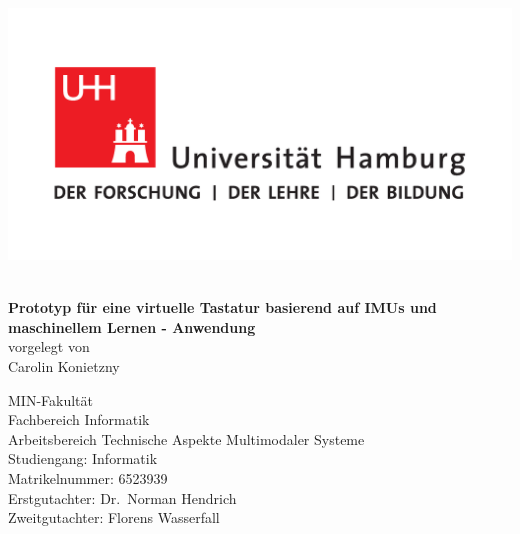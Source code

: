 \frontmatter
{}
\begin{titlepage}
\includegraphics[scale=0.3]{UHH-Logo_2010_Farbe_CMYK.pdf}
\vspace*{2cm}
\Large
\begin{center}{\color{uhhred}\textbf{}}
\vspace*{2.0cm}\\
{\LARGE \textbf{Prototyp für eine virtuelle Tastatur basierend auf IMUs und maschinellem Lernen - Anwendung}}
\vspace*{2.0cm}\\
vorgelegt von
\vspace*{0.4cm}\\
Carolin Konietzny
\end{center}

\vspace*{3.9cm}

\noindent
MIN-Fakultät \vspace*{0.4cm} \\
Fachbereich Informatik \vspace*{0.4cm} \\
Arbeitsbereich Technische Aspekte Multimodaler Systeme \vspace*{0.4cm} \\
Studiengang: Informatik \vspace*{0.4cm} \\
Matrikelnummer: 6523939 \vspace*{0.8cm} \\
Erstgutachter: Dr.~Norman Hendrich \vspace*{0.4cm} \\
Zweitgutachter: Florens Wasserfall

\end{titlepage}

\restoregeometry{}

